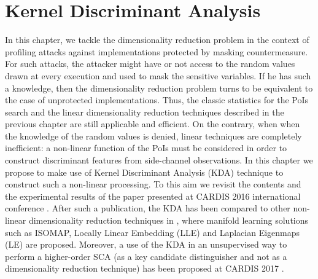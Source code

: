 
\chapter{Kernel Discriminant Analysis} %
\label{ChapterKernel}

In this chapter, we tackle the dimensionality reduction problem in the context of profiling attacks against implementations protected by masking countermeasure. For such attacks, the attacker might have or not access to the  random values drawn at every execution and used to mask the sensitive variables. If he has such a knowledge, then the dimensionality reduction problem turns to be equivalent to the case of unprotected implementations. Thus, the classic statistics for the PoIs search and the linear dimensionality reduction techniques described in the previous chapter are still applicable and efficient. On the contrary, when when the knowledge of the random values is denied, linear techniques are completely inefficient: a non-linear function of the PoIs must be considered in order to construct discriminant features from side-channel observations. In this chapter we propose to make use of Kernel Discriminant Analysis (KDA) technique to construct such a non-linear processing. To this aim we revisit the contents and the experimental results of the paper presented at CARDIS 2016 international conference \cite{cagli2016kernel}. After such a publication, the KDA has been compared to other non-linear dimensionality reduction techniques in \cite{manifold}, where manifold learning solutions such as ISOMAP, Locally Linear Embedding (LLE) and Laplacian Eigenmaps (LE) are proposed. Moreover, a use of the KDA in an unsupervised way to perform a higher-order SCA (as a key candidate distinguisher and not as a dimensionality reduction technique) has been proposed at CARDIS 2017 \cite{zhou2017novel}.



